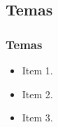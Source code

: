 \subsection[Temas]{Temas}\label{subsec:seminarios-temas}



\begin{frame}[t]\frametitle{Temas}

  \begin{itemize}
    \justifying{}
    \setlength\itemsep{1em}
    \item Item 1.
    \item Item 2.
    \item Item 3.
  \end{itemize}

\end{frame}
